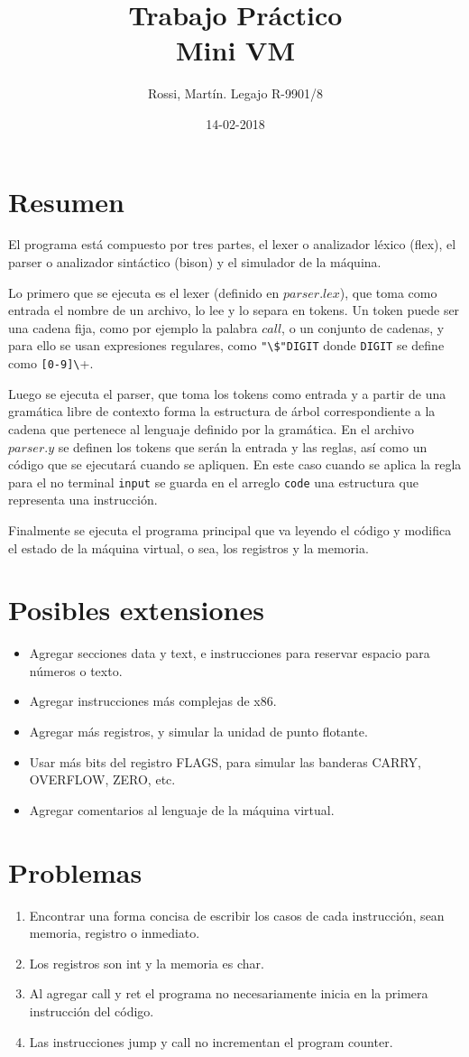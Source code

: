 \documentclass[12pt]{article}
\title{{\textbf{\Large{Trabajo Práctico}\\Mini VM}}}
\author{Rossi, Martín. Legajo R-9901/8}
\date{14-02-2018}
\begin{document}
\maketitle
\section*{Resumen}
\indent El programa está compuesto por tres partes, el lexer o analizador léxico (flex), el parser o analizador sintáctico (bison) y el simulador de la máquina.\par Lo primero que se ejecuta es el lexer (definido en $parser.lex$), que toma como entrada el nombre de un archivo, lo lee y lo separa en tokens. Un token puede ser una cadena fija, como por ejemplo la palabra $call$, o un conjunto de cadenas, y para ello se usan expresiones regulares, como \verb+"\$"DIGIT+ donde \verb+DIGIT+ se define como \verb+[0-9]\++.\par Luego se ejecuta el parser, que toma los tokens como entrada y a partir de una gramática libre de contexto forma la estructura de árbol correspondiente a la cadena que pertenece al lenguaje definido por la gramática. En el archivo $parser.y$ se definen los tokens que serán la entrada y las reglas, así como un código que se ejecutará cuando se apliquen. En este caso cuando se aplica la regla para el no terminal \verb+input+ se guarda en el arreglo \verb+code+ una estructura que representa una instrucción.\par Finalmente se ejecuta el programa principal que va leyendo el código y modifica el estado de la máquina virtual, o sea, los registros y la memoria.
\section*{Posibles extensiones}
\begin{itemize}
\item Agregar secciones data y text, e instrucciones para reservar espacio para números o texto.
\item Agregar instrucciones más complejas de x86.
\item Agregar más registros, y simular la unidad de punto flotante.
\item Usar más bits del registro FLAGS, para simular las banderas CARRY, OVERFLOW, ZERO, etc.
\item Agregar comentarios al lenguaje de la máquina virtual.
\end{itemize}
\section*{Problemas}
\begin{enumerate}
\item Encontrar una forma concisa de escribir los casos de cada instrucción, sean memoria, registro o inmediato.
\item Los registros son int y la memoria es char.
\item Al agregar call y ret el programa no necesariamente inicia en la primera instrucción del código.
\item Las instrucciones jump y call no incrementan el program counter.
\end{enumerate}
\end{document}
